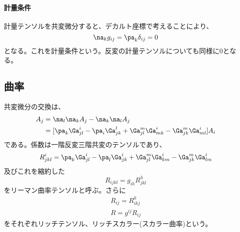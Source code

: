             \paragraph{計量条件}
                計量テンソルを共変微分すると、デカルト座標で考えることにより、
                    \[\na_kg_{ij} = \pa_k\delta_{ij} = 0\]
                となる。これを計量条件という。反変の計量テンソルについても同様に0となる。
        \subsection{曲率}
            共変微分の交換は、
            \begin{align*}
                [\na_l,\na_k]A_j &= \na_l\na_kA_j-\na_k\na_lA_j\\
                &= [\pa_k\Ga^i_{jl}-\pa_i\Ga^l_{jk}
                +\Ga^m_{jl}\Ga^i_{mk}-\Ga^m_{jk}\Ga^i_{ml}]A_i
            \end{align*}
            である。係数は一階反変三階共変のテンソルであり、
                \[R^i_{jkl}
                =\pa_k\Ga^i_{jl}-\pa_l\Ga^i_{jk}
                +\Ga^m_{jl}\Ga^i_{km}-\Ga^m_{jk}\Ga^i_{lm}\]
            及びこれを縮約した
                \[R_{ijkl} = g_{ih}R^h_{jkl}\]
            をリーマン曲率テンソルと呼ぶ。さらに
            \begin{gather*}
                R_{ij} = R^k_{ikj}\\
                R = g^{ij}R_{ij}
            \end{gather*}
            をそれぞれリッチテンソル、リッチスカラー(スカラー曲率)という。
